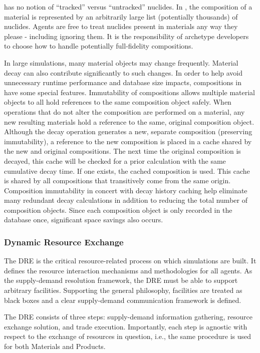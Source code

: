 \Cyclus has no notion of ``tracked'' versus ``untracked'' nuclides.  In \Cyclus, the composition of a material
is represented by an arbitrarily large list (potentially thousands) of
nuclides.  Agents are free to treat nuclides present in materials any way they
please - including ignoring them.  It is the responsibility of archetype
developers to choose how to handle potentially full-fidelity compositions.

In large simulations, many material objects may change frequently.
Material decay can also contribute significantly to such changes.  In order to
help avoid unnecessary runtime performance and database size impacts,
compositions in \Cyclus have some special features.
Immutability of compositions allows multiple material objects to all hold
references to the same composition object safely.  When operations that do not
alter the composition are performed on a material, any new resulting
materials hold a reference to the same, original composition object.
Although the decay operation generates a new, separate composition (preserving
immutability), a reference to the new composition is placed in a cache shared
by the new and original compositions. The next time the original
composition is decayed, this cache will be checked for a prior calculation
with the same cumulative decay time.  If one exists, the cached composition is
used.  This cache is shared by all compositions that transitively come from
the same origin.  Composition immutability in concert with decay history
caching help eliminate many redundant decay calculations in addition to
reducing the total number of composition objects.  Since each composition
object is only recorded in the database once, significant space savings also
occurs. 

\subsubsection{Dynamic Resource Exchange}

The \gls{DRE} is the critical resource-related process on which \Cyclus
simulations are built. It defines the resource interaction mechanisms and
methodologies for all agents. As the \Cyclus supply-demand resolution framework,
the DRE must be able to support arbitrary facilities. Supporting the general
\Cyclus philosophy, facilities are treated as black boxes and a clear
supply-demand communication framework is defined.

The \gls{DRE} consists of three steps: supply-demand information
gathering, resource exchange solution, and trade execution. Importantly, each
step is agnostic with respect to the exchange of resources in question, i.e.,
the same procedure is used for both Materials and Products.

